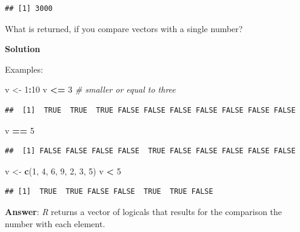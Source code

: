 \documentclass[
]{scrartcl}
\makeatletter
\newenvironment{Shaded}{\begin{snugshade}}{\end{snugshade}}
\newcommand{\CommentTok}[1]{\textcolor[rgb]{0.56,0.35,0.01}{\textit{#1}}}
\newcommand{\DecValTok}[1]{\textcolor[rgb]{0.00,0.00,0.81}{#1}}
\newcommand{\FunctionTok}[1]{\textcolor[rgb]{0.13,0.29,0.53}{\textbf{#1}}}
\newcommand{\NormalTok}[1]{#1}
\newcommand{\OtherTok}[1]{\textcolor[rgb]{0.56,0.35,0.01}{#1}}
\newcommand{\SpecialCharTok}[1]{\textcolor[rgb]{0.81,0.36,0.00}{\textbf{#1}}}
\newenvironment{kframe}{%
\medskip{}
\setlength{\fboxsep}{.8em}
 \def\at@end@of@kframe{}%
 \ifinner\ifhmode%
  \def\at@end@of@kframe{\end{minipage}}%
  \begin{minipage}{\columnwidth}%
 \fi\fi%
 \def\FrameCommand##1{\hskip\@totalleftmargin \hskip-\fboxsep
 \colorbox{shadecolor}{##1}\hskip-\fboxsep
     \hskip-\linewidth \hskip-\@totalleftmargin \hskip\columnwidth}%
 \MakeFramed {\advance\hsize-\width
   \@totalleftmargin\z@ \linewidth\hsize
   \@setminipage}}%
 {\par\unskip\endMakeFramed%
 \at@end@of@kframe}
\newenvironment{rmdblock}[1]
  {
  \begin{itemize}
  \renewcommand{\labelitemi}{
    \raisebox{-.7\height}[0pt][0pt]{
      {\setkeys{Gin}{width=3em,keepaspectratio}\texttt{[image: images/\#1]}}
    }
  }
  \setlength{\fboxsep}{1em}
  \begin{kframe}
  \item
  }
  {
  \end{kframe}
  \end{itemize}
  }
\newenvironment{myexercise}
    {\begin{rmdblock}{exercise_green}}
    {\end{rmdblock}}
\newenvironment{webexsolution}[1]
    {\par\tiny\textbf{#1}}
    {\par}
\newcommand{\webexhide}[1]{\begin{webexsolution}{#1}}
\newcommand{\webexunhide}{\end{webexsolution}}
\makeatother
\begin{document}
\begin{verbatim}
## [1] 3000
\end{verbatim}

\begin{myexercise}
What is returned, if you compare vectors with a single number?
\end{myexercise}
\webexhide{Solution}

Examples:

\begin{Shaded}
\begin{Highlighting}[]
\NormalTok{v }\OtherTok{\textless{}{-}} \DecValTok{1}\SpecialCharTok{:}\DecValTok{10}
\NormalTok{v }\SpecialCharTok{\textless{}=} \DecValTok{3}   \CommentTok{\# smaller or equal to three}
\end{Highlighting}
\end{Shaded}

\begin{verbatim}
##  [1]  TRUE  TRUE  TRUE FALSE FALSE FALSE FALSE FALSE FALSE FALSE
\end{verbatim}

\begin{Shaded}
\begin{Highlighting}[]
\NormalTok{v }\SpecialCharTok{==} \DecValTok{5}
\end{Highlighting}
\end{Shaded}

\begin{verbatim}
##  [1] FALSE FALSE FALSE FALSE  TRUE FALSE FALSE FALSE FALSE FALSE
\end{verbatim}

\begin{Shaded}
\begin{Highlighting}[]
\NormalTok{v }\OtherTok{\textless{}{-}} \FunctionTok{c}\NormalTok{(}\DecValTok{1}\NormalTok{, }\DecValTok{4}\NormalTok{, }\DecValTok{6}\NormalTok{, }\DecValTok{9}\NormalTok{, }\DecValTok{2}\NormalTok{, }\DecValTok{3}\NormalTok{, }\DecValTok{5}\NormalTok{)}
\NormalTok{v }\SpecialCharTok{\textless{}} \DecValTok{5}
\end{Highlighting}
\end{Shaded}

\begin{verbatim}
## [1]  TRUE  TRUE FALSE FALSE  TRUE  TRUE FALSE
\end{verbatim}

\textbf{Answer}: \emph{R} returns a vector of logicals that results for the comparison the number with each element.
\webexunhide
\end{document}

